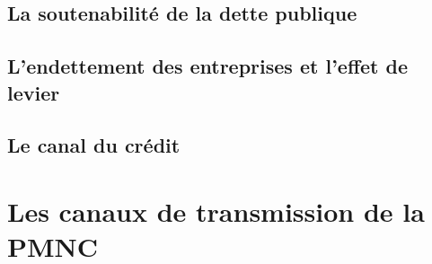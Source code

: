 \documentclass[a4paper, 12pt]{report}
\begin{document}
\subsection{La soutenabilité de la dette publique}
	
\subsection{L'endettement des entreprises et l'effet de levier}
	
\subsection{Le canal du crédit}
	
\section{Les canaux de transmission de la PMNC}
	
	
	
	
	
	
	
	
	
	
	
	
	
	
	
	
	
	
	
	
	
	
	
	
	
	
\end{document}
